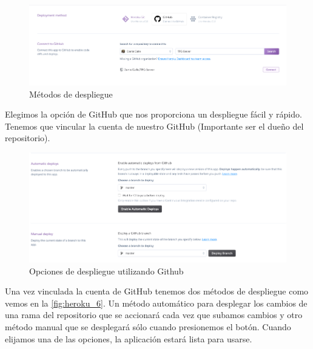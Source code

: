 \begin{figure}[H]
    \centering
    \includegraphics[width=6in]{figures/appendix-A/heroku_5.png}
    \caption{Métodos de despliegue}
    \label{fig:heroku_5}
\end{figure}
Elegimos la opción de GitHub que nos proporciona un despliegue fácil y rápido.
Tenemos que vincular la cuenta de nuestro GitHub (Importante ser el dueño del
 repositorio).
\begin{figure}[H]
    \centering
    \includegraphics[width=6in]{figures/appendix-A/heroku_6.png}
    \caption{Opciones de despliegue utilizando Github}
    \label{fig:heroku_6}
\end{figure}
Una vez vinculada la cuenta de GitHub tenemos dos métodos de despliegue como
 vemos en la \autoref{fig:heroku_6}. Un método automático para desplegar los
 cambios de una rama del repositorio que se accionará cada vez que subamos
 cambios y otro método manual que se desplegará sólo cuando presionemos
 el botón. 
Cuando elijamos una de las opciones, la aplicación estará lista para usarse.